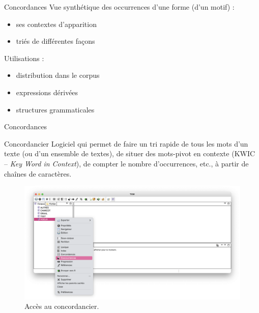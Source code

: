 \documentclass[xetex,xcolor={table,usenames,dvipsnames}]{beamer}
\begin{document}
\begin{frame}{Concordances}
	Vue synthétique des occurrences d'une forme (d'un motif) :
	\begin{itemize}
		\item ses contextes d'apparition
		\item triés de différentes façons
	\end{itemize}
	
	Utilisations :
	\begin{itemize}
		\item distribution dans le corpus
		\item expressions dérivées
		\item structures grammaticales
	\end{itemize}
	
	
\end{frame}

\begin{frame}{Concordances}
	\begin{block}{Concordancier}
		\justifying
		Logiciel qui permet de faire un tri rapide de tous les mots d'un texte (ou d'un ensemble de textes), de situer des mots-pivot en contexte (\textsc{KWIC} – \textit{Key Word in Context}), de compter le nombre d'occurrences, etc., à partir de chaînes de caractères.
	\end{block}
	\begin{figure}[h] %
		\centering
		\includegraphics[width=0.80\linewidth]{img/concordances.png}
		\caption{Accès au concordancier.}
		\label{fig:ling_out_TAL}
	\end{figure}
\end{frame}
\end{document}

